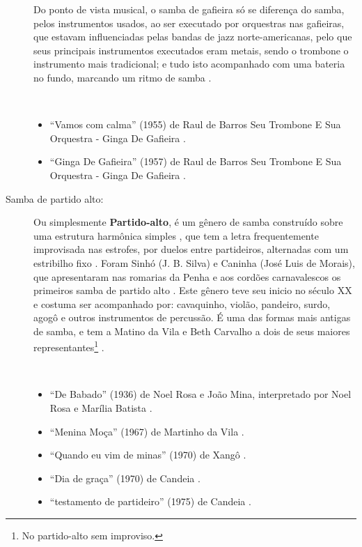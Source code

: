\begin{description}
Do ponto de vista musical, o samba de gafieira só se diferença do samba, 
pelos instrumentos usados, ao ser executado por orquestras nas gafieiras,
que estavam influenciadas pelas bandas de jazz norte-americanas,
pelo que seus principais instrumentos executados eram metais, 
sendo o trombone o instrumento mais tradicional;
e tudo isto acompanhado com uma bateria no fundo, 
marcando um ritmo de samba \cite[pp. 131]{perna2002samba}.


\begin{example} ~

\begin{itemize}
\item ``Vamos com calma'' (1955) de  Raul de Barros Seu Trombone E Sua Orquestra - Ginga De Gafieira \cite{RaulDeBarrosMusic1}.
\item ``Ginga De Gafieira'' (1957) de  Raul de Barros Seu Trombone E Sua Orquestra - Ginga De Gafieira \cite{RaulDeBarrosMusic2}.
\end{itemize}
\end{example}

\item[Samba de partido alto:] 
Ou simplesmente \textbf{Partido-alto}, 
é um gênero de samba construído sobre uma estrutura harmônica simples \cite[pp. 291]{dourado2004dicionario}, 
que tem a letra frequentemente improvisada  nas estrofes, por duelos entre partideiros, alternadas com um estribilho fixo \cite[128]{perna2002samba} \cite[pp. 291]{dourado2004dicionario}.
Foram Sinhó (J. B. Silva) e Caninha (José Luis de Morais),
que apresentaram nas romarias da Penha e aos cordões carnavalescos os primeiros samba de partido alto \cite[pp. 4]{musicasambavariasdef1}. 
Este gênero teve seu inicio no século XX e costuma ser acompanhado por: 
cavaquinho, violão, pandeiro, surdo, agogô e outros instrumentos de percussão.
É uma das formas mais antigas de samba, 
e tem a Matino da Vila e Beth Carvalho a dois de seus maiores representantes\footnote{No partido-alto sem improviso.} \cite[pp. 291]{dourado2004dicionario} \cite[pp. 212]{diniz2006almanaque}. 

\begin{example} ~

\begin{itemize}
\item ``De Babado'' (1936) de Noel Rosa e João Mina, interpretado por  Noel Rosa e Marília Batista \cite[pp. 46]{diniz2006almanaque}.
\item ``Menina Moça'' (1967) de Martinho da Vila \cite[pp. 185]{diniz2006almanaque}.
\item ``Quando eu vim de minas'' (1970) de Xangô \cite[pp. 212]{diniz2006almanaque}.
\item ``Dia de graça'' (1970) de Candeia \cite[pp. 137]{marcondes1977enciclopedia} \cite[pp. 121]{diniz2006almanaque}.
\item ``testamento de partideiro'' (1975) de Candeia \cite[pp. 105]{raca1999} \cite[pp. 122]{diniz2006almanaque}.
\end{itemize}
\end{example}



\end{description}
